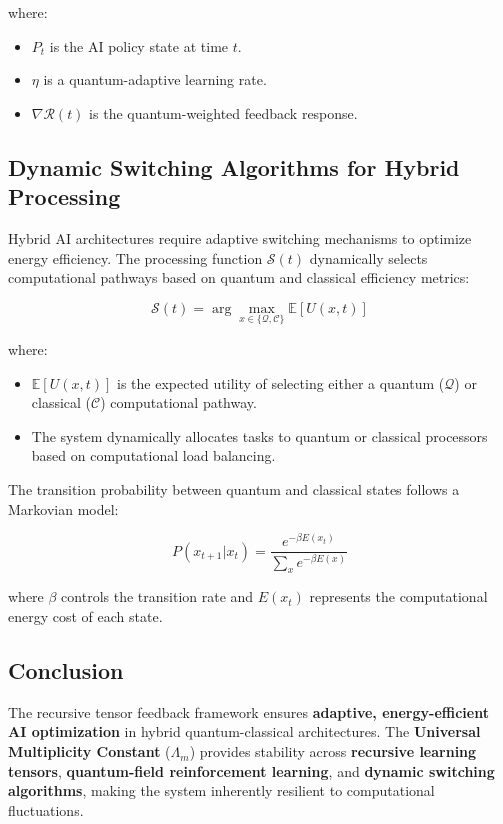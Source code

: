 \documentclass{article}
\theoremstyle{plain}
\begin{document}
where:
\begin{itemize}
    \item $P_t$ is the AI policy state at time $t$.
    \item $\eta$ is a quantum-adaptive learning rate.
    \item $\nabla \mathcal{R}(t)$ is the quantum-weighted feedback response.
\end{itemize}

\subsection{Dynamic Switching Algorithms for Hybrid Processing}

Hybrid AI architectures require adaptive switching mechanisms to optimize energy efficiency. The processing function $\mathcal{S}(t)$ dynamically selects computational pathways based on quantum and classical efficiency metrics:

\begin{equation}
    \mathcal{S}(t) = \arg\max_{x \in \{ \mathcal{Q}, \mathcal{C} \}} \mathbb{E}[U(x, t)]
\end{equation}

where:
\begin{itemize}
    \item $\mathbb{E}[U(x, t)]$ is the expected utility of selecting either a quantum ($\mathcal{Q}$) or classical ($\mathcal{C}$) computational pathway.
    \item The system dynamically allocates tasks to quantum or classical processors based on computational load balancing.
\end{itemize}

The transition probability between quantum and classical states follows a Markovian model:

\begin{equation}
    P(x_{t+1} | x_t) = \frac{e^{-\beta E(x_t)}}{\sum_{x} e^{-\beta E(x)}}
\end{equation}

where $\beta$ controls the transition rate and $E(x_t)$ represents the computational energy cost of each state.

\subsection{Conclusion}

The recursive tensor feedback framework ensures \textbf{adaptive, energy-efficient AI optimization} in hybrid quantum-classical architectures. The \textbf{Universal Multiplicity Constant} ($\Lambda_m$) provides stability across \textbf{recursive learning tensors}, \textbf{quantum-field reinforcement learning}, and \textbf{dynamic switching algorithms}, making the system inherently resilient to computational fluctuations.
\end{document}
